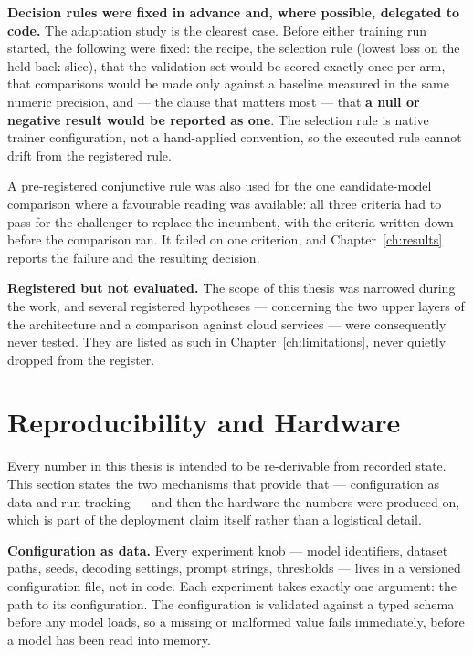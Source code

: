 \textbf{Decision rules were fixed in advance and, where possible, delegated to code.} The
adaptation study is the clearest case. Before either training run started, the following were
fixed: the recipe, the selection rule (lowest loss on the held-back slice), that the
validation set would be scored exactly once per arm, that comparisons would be made only
against a baseline measured in the same numeric precision, and --- the clause that matters
most --- that \textbf{a null or negative result would be reported as one}. The selection rule
is native trainer configuration, not a hand-applied convention, so the executed rule
cannot drift from the registered rule.

A pre-registered conjunctive rule was also used for the one candidate-model comparison where
a favourable reading was available: all three criteria had to pass for the challenger to
replace the incumbent, with the criteria written down before the comparison ran. It failed on
one criterion, and Chapter~\ref{ch:results} reports the failure and the resulting decision.

\textbf{Registered but not evaluated.} The scope of this thesis was narrowed during the work,
and several registered hypotheses --- concerning the two upper layers of the architecture and
a comparison against cloud services --- were consequently never tested. They are listed as
such in Chapter~\ref{ch:limitations}, never quietly dropped from the
register.

\section{Reproducibility and Hardware}
\label{sec:method-repro}

Every number in this thesis is intended to be re-derivable from recorded state. This
section states the two mechanisms that provide that --- configuration as data and run
tracking --- and then the hardware the numbers were produced on, which is part of the
deployment claim itself rather than a logistical detail.

\textbf{Configuration as data.} Every experiment knob --- model identifiers, dataset paths,
seeds, decoding settings, prompt strings, thresholds --- lives in a versioned configuration
file, not in code. Each experiment takes exactly one argument: the path to its configuration.
The configuration is validated against a typed schema \parencite{pydantic} before any model loads,
so a missing or malformed value fails immediately, before a model has been read into
memory.


